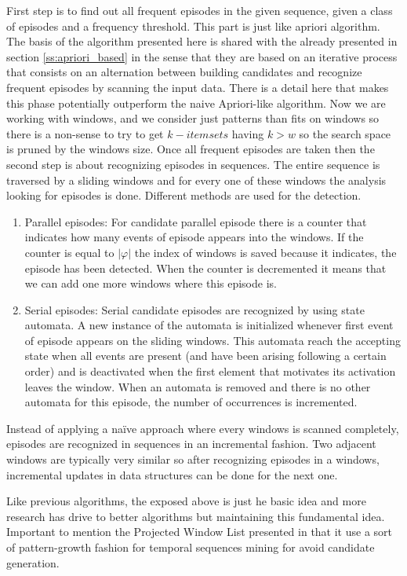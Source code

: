 First step is to find out all frequent episodes in the given sequence, given a
class of episodes and a frequency threshold. This part is just like apriori
algorithm. The basis of the algorithm presented here is shared with the already 
presented in section \ref{ss:apriori_based} in the sense that they are based on an
iterative process that consists on an alternation between building candidates 
and recognize frequent episodes by scanning the input data. There is a detail
here that makes this phase potentially outperform the naive Apriori-like
algorithm. Now we are working with windows, and we consider just patterns than
fits on windows so there is a non-sense to try to get $k-itemsets$ having $k >
w$ so the search space is pruned by the windows size. Once all frequent 
episodes are taken then the second step is about recognizing episodes in 
sequences. The entire sequence is traversed by a sliding windows and for every one of these windows the analysis looking for episodes is done. 
Different methods are used for the detection. 
\begin{enumerate}[label=\roman*)]
  \item Parallel episodes: For candidate parallel episode there is a counter
    that indicates how many events of episode appears into the windows. If the
    counter is equal to $|\varphi|$ the index of windows is saved because it
    indicates, the episode has been detected. When the counter is decremented
    it means that we can add one more windows where this episode is.
  \item Serial episodes: Serial candidate episodes are recognized by using state
    automata. A new instance of the automata is initialized whenever first event
    of episode appears on the sliding windows. This automata reach the accepting
    state when all events are present (and have been arising following a certain
    order) and is deactivated when the first element
    that motivates its activation leaves the window. When an automata is removed
    and there is no other automata for this episode, the number of occurrences
    is incremented.
\end{enumerate}

Instead of applying a naïve approach where every windows is scanned
completely, episodes are recognized in sequences in an incremental fashion. 
Two adjacent windows are typically very similar so after
recognizing episodes in a windows, incremental updates in data structures can be
done for the next one.

Like previous algorithms, the exposed above is just he basic idea and more
research has drive to better algorithms but maintaining this fundamental idea.
Important to mention the Projected Window List presented in
\cite{huang2004prowl} that it use a sort of pattern-growth fashion for temporal
sequences mining for avoid candidate generation.


